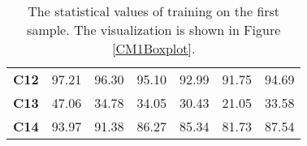 \begin{appendices}
\begin{table}[h]
{\begin{tabular}{c|cccccc}
{\color[HTML]{000000} \textbf{C12}} & {\color[HTML]{000000} 97.21} & {\color[HTML]{000000} 96.30} & {\color[HTML]{000000} 95.10} & {\color[HTML]{000000} 92.99} & {\color[HTML]{000000} 91.75} & {\color[HTML]{000000} 94.69} \\
\rowcolor[HTML]{DAE8E5} 
{\color[HTML]{000000} \textbf{C13}} & {\color[HTML]{000000} 47.06} & {\color[HTML]{000000} 34.78} & {\color[HTML]{000000} 34.05} & {\color[HTML]{000000} 30.43} & {\color[HTML]{000000} 21.05} & {\color[HTML]{000000} 33.58} \\
\rowcolor[HTML]{EEF9FB} 
{\color[HTML]{000000} \textbf{C14}} & {\color[HTML]{000000} 93.97} & {\color[HTML]{000000} 91.38} & {\color[HTML]{000000} 86.27} & {\color[HTML]{000000} 85.34} & {\color[HTML]{000000} 81.73} & {\color[HTML]{000000} 87.54} \\
\bottomrule
\end{tabular}
}
\caption{The statistical values of training on the first sample. The visualization is shown in Figure \ref{CM1Boxplot}.}
\label{CM1BoxplotValues}
\end{table}


\end{appendices}
